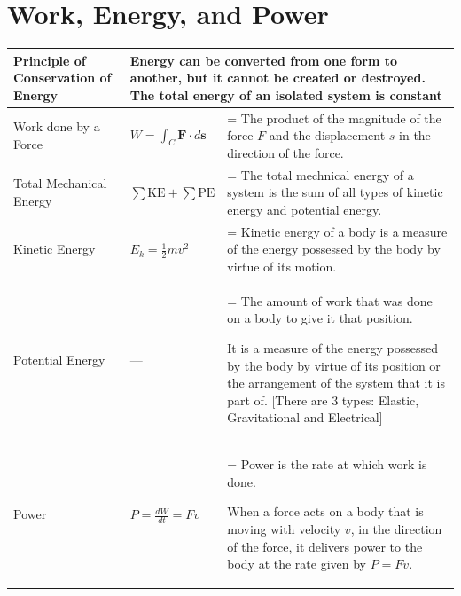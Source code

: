 \documentclass[a4paper,11pt]{article}
\newlength{\oldparskip}
\begin{document}
	\section{Work, Energy, and Power}
		\begin{center}
			\renewcommand{\arraystretch}{1.5}
			\begin{tabular}{p{4cm} l >{\parskip=\oldparskip}p{7.7cm} @{}}
				\toprule
				Principle of Conservation of Energy & \multicolumn{2}{p{10.7cm}}{Energy can be \textbf{converted} from one form to another, but it \textbf{cannot be created or destroyed}. The \textbf{total energy} of an \textbf{isolated} system is constant}\\
				\midrule
				Work done by a Force & $\displaystyle W=\int_{C}^{} \textbf{F} \cdot d\textbf{s} $ & The product of the magnitude of the force $F$ and the displacement $s$ in the direction of the force. \\
				Total Mechanical Energy & $\sum \textrm{KE} + \sum \textrm{PE}$ & The total mechnical energy of a system is the sum of all types of kinetic energy and potential energy. \\
				Kinetic Energy & $E_k = \frac{1}{2}mv^2$ & Kinetic energy of a body is a measure of the energy possessed by the body by virtue of its motion.\\
				Potential Energy & --- & The amount of work that was done on a body to give it that position. \par It is a measure of the energy possessed by the body by virtue of its position or the arrangement of the system that it is part of. [There are 3 types: Elastic, Gravitational and Electrical]\\
				Power & $\displaystyle P=\frac{dW}{dt}=Fv$ & Power is the rate at which work is done. \par When a force acts on a body that is moving with velocity $v$, in the direction of the force, it delivers power to the body at the rate given by $P=Fv$.\\
				\bottomrule
			\end{tabular}
		\end{center}
	\newpage
\end{document}
